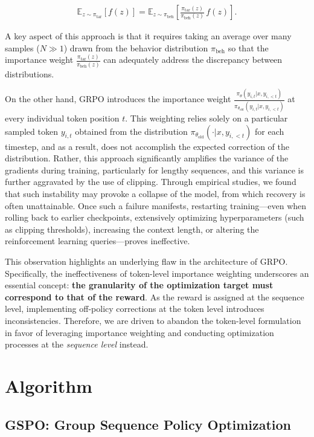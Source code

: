 \begin{align}
\mathbb{E}_{z \sim \pi_\text{tar}} \left[ f(z) \right] = \mathbb{E}_{z \sim \pi_\text{beh}} \left[ \frac{ \pi_\text{tar} (z) }{ \pi_\text{beh} (z)} \, f(z) \right].
\end{align}

A key aspect of this approach is that it requires taking an average over many samples ($N \gg 1$) drawn from the behavior distribution $\pi_\text{beh}$ so that the importance weight $\frac{ \pi_\text{tar} (z) }{ \pi_\text{beh} (z)}$ can adequately address the discrepancy between distributions.

On the other hand, GRPO introduces the importance weight $\frac{ \pi_{\theta} (y_{i,t} | x, y_{i,<t}) }{ \pi_{\theta_\text{old}} (y_{i,t} | x,y_{i,<t})}$ at every individual token position $t$. This weighting relies solely on a particular sampled token $y_{i,t}$ obtained from the distribution $\pi_{\theta_\text{old}}( \cdot | x, y_{i, <t})$ for each timestep, and as a result, does not accomplish the expected correction of the distribution. Rather, this approach significantly amplifies the variance of the gradients during training, particularly for lengthy sequences, and this variance is further aggravated by the use of clipping. Through empirical studies, we found that such instability may provoke a collapse of the model, from which recovery is often unattainable. Once such a failure manifests, restarting training—even when rolling back to earlier checkpoints, extensively optimizing hyperparameters (such as clipping thresholds), increasing the context length, or altering the reinforcement learning queries—proves ineffective.

This observation highlights an underlying flaw in the architecture of GRPO. Specifically, the ineffectiveness of token-level importance weighting underscores an essential concept: \textbf{the granularity of the optimization target must correspond to that of the reward}. As the reward is assigned at the sequence level, implementing off-policy corrections at the token level introduces inconsistencies. Therefore, we are driven to abandon the token-level formulation in favor of leveraging importance weighting and conducting optimization processes at the \textit{sequence level} instead.

\section{Algorithm}

\subsection{GSPO: Group Sequence Policy Optimization}

